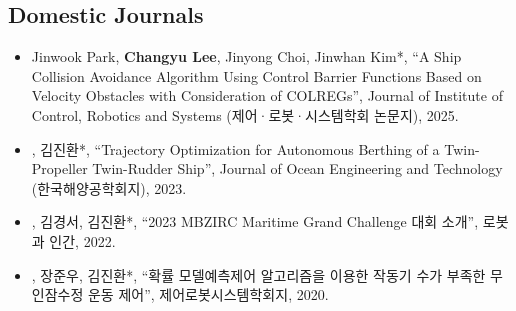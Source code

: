 \documentclass[10pt, letterpaper]{article}
\begin{document}
    
    \subsection{Domestic Journals}        
    \begin{itemize}
        \item [\textbf{[D4]}] Jinwook Park, \textbf{Changyu Lee}, Jinyong Choi, Jinwhan Kim*, “A Ship Collision Avoidance Algorithm Using Control Barrier Functions Based on Velocity Obstacles with Consideration of COLREGs”, \textcolor{NavyBlue}{Journal of Institute of Control, Robotics and Systems (제어·로봇·시스템학회 논문지)}, 2025.

            \vspace{0.2 cm}

        \item [\textbf{[D3]}] , 김진환*, “Trajectory Optimization for Autonomous Berthing of a Twin-Propeller Twin-Rudder Ship”, \textcolor{NavyBlue}{Journal of Ocean Engineering and Technology (한국해양공학회지)}, 2023.
            
            \vspace{0.2 cm}
        
        \item [\textbf{[D2]}] , 김경서, 김진환*, “2023 MBZIRC Maritime Grand Challenge 대회 소개”, \textcolor{NavyBlue}{로봇과 인간}, 2022.
            
            \vspace{0.2 cm}
        
        \item [\textbf{[D1]}] , 장준우, 김진환*, “확률 모델예측제어 알고리즘을 이용한 작동기 수가 부족한 무인잠수정 운동 제어”, \textcolor{NavyBlue}{제어로봇시스템학회지}, 2020.
     \end{itemize}
\end{document}
